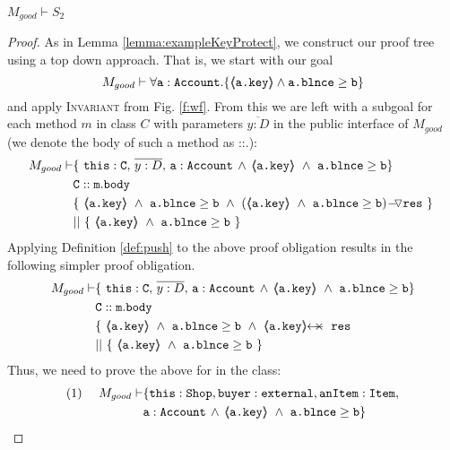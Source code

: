 \begin{lemma}
$M_{good} \vdash S_2$
\end{lemma}
\begin{proof}
As in Lemma \ref{lemma:exampleKeyProtect}, we construct our proof tree using a top down approach.  That is, we start with our goal
$$M_{good} \vdash \forall {\mbox{\normalfont{\texttt{a}}}:\mbox{\normalfont{\texttt{Account}}}}.{{\{}}{\langle\!\!\langle \mbox{\normalfont{\texttt{a.key}}} \rangle\!\!\rangle \wedge \mbox{\normalfont{\texttt{a.blnce}}} \geq \mbox{\normalfont{\texttt{b}}}}{{\}}}$$
and apply  \textsc{Invariant} from Fig. \ref{f:wf}.
From this we are left with a subgoal for each method $m$ in  class $C$ with parameters $\overline{y:D}$ in the public interface of $M_{good}$ (we denote the body of such a method as ::.):
\small
\begin{align*}
M_{good} \vdash
		& \{ \ \prg{this}:\prg{C},\, \overline{y:D},\, \prg{a}:\prg{Account}\, \wedge\,
		   {\inside{\prg{a.key}}}\ \wedge\ {\prg{a.blnce} \geq \prg{b}}\} \\
		& \prg{C}::\prg{m}.\prg{body}\ \\
		& \{\ {\inside{\prg{a.key}}\ \wedge\ {\prg{a.blnce} \geq \prg{b}}}\ 
		\wedge\ {\PushASLong {\prg{res}} 
							{(\inside{\prg{a.key}}\ \wedge\ 
							 {\prg{a.blnce} \geq \prg{b}})}}\ \}\ \\
		& ||\ \{\ {\inside{\prg{a.key}}\ \wedge\ 
							 {\prg{a.blnce} \geq \prg{b}}}\ \} 
\end{align*}
\normalsize
Applying Definition \ref{def:push} to the above proof obligation results in the following 
simpler proof obligation.
\small
\begin{align*}
M_{good} \vdash
		& \{ \ \prg{this}:\prg{C},\, \overline{y:D},\, \prg{a}:\prg{Account}\, \wedge\,
		   {\inside{\prg{a.key}}}\ \wedge\ {\prg{a.blnce} \geq \prg{b}}\} \\
		& \prg{C}::\prg{m}.\prg{body}\ \\
		& \{\ {\inside{\prg{a.key}}\ \wedge\ {\prg{a.blnce} \geq \prg{b}}}\ 
		\wedge\ {\protectedFrom{\prg{a.key}}{\prg{res}}}\ \\
		& ||\ \{\ {\inside{\prg{a.key}}\ \wedge\ 
							 {\prg{a.blnce} \geq \prg{b}}}\ \}
\end{align*}
\normalsize
Thus, we need to prove the above for \prg{buy} in the  class:
\small
\begin{align*}
\text{(1)}  \ \ \ \ M_{good} \vdash 
		&	\{  \prg{this}:\prg{Shop}, \prg{buyer} : \prg{external}, 
		\prg{anItem} : \prg{Item},\\
		& \prg{a}:\prg{Account}\, \wedge\, {\inside{\prg{a.key}}}\ \wedge\ {\prg{a.blnce} \geq \prg{b}}\} \\

\end{align*}
\end{proof}
